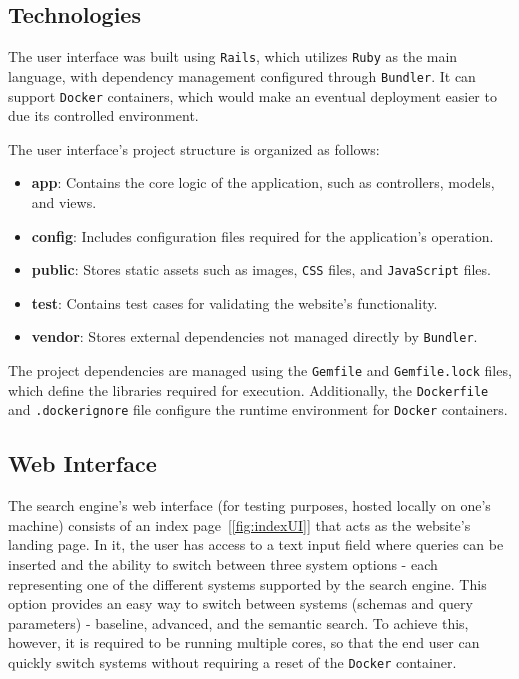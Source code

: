 \documentclass[sigconf]{acmart}
\begin{document}
\subsection{Technologies} 

The user interface was built using \texttt{Rails}\cite{rails}, which utilizes \texttt{Ruby}\cite{ruby} as the main language, with dependency management configured through \texttt{Bundler}\cite{bundler}. It can support \texttt{Docker}\cite{docker} containers, which would make an eventual deployment easier to due its controlled environment.

The user interface's project structure is organized as follows:

\begin{itemize} 
    \item \textbf{app}: Contains the core logic of the application, such as controllers, models, and views\cite{mvc}. 
    \item \textbf{config}: Includes configuration files required for the application's operation. 
    \item \textbf{public}: Stores static assets such as images, \texttt{CSS} files, and \texttt{JavaScript} files. 
    \item \textbf{test}: Contains test cases for validating the website's functionality. 
    \item \textbf{vendor}: Stores external dependencies not managed directly by \texttt{Bundler}. 
\end{itemize}

The project dependencies are managed using the \texttt{Gemfile} and \texttt{Gemfile.lock} files, which define the libraries required for execution. Additionally, the \texttt{Dockerfile} and \texttt{.dockerignore} file configure the runtime environment for \texttt{Docker} containers.

\subsection{Web Interface}

The search engine's web interface (for testing purposes, hosted locally on one's machine) consists of an index page~[\ref{fig:indexUI}] that acts as the website's landing page. In it, the user has access to a text input field where queries can be inserted and the ability to switch between three system options - each representing one of the different systems supported by the search engine. This option provides an easy way to switch between systems (schemas and query parameters) - baseline, advanced, and the semantic search.
To achieve this, however, it is required to be running multiple cores, so that the end user can quickly switch systems without requiring a reset of the \texttt{Docker} container.
\end{document}
